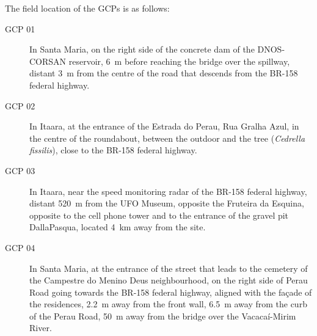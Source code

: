 The field location of the GCPs is as follows:

\begin{description}
\item[GCP 01]
In Santa Maria, on the right side of the concrete dam of the DNOS-CORSAN reservoir, \SI{6}{\m} 
before reaching the bridge over the spillway, distant \SI{3}{\m} from the centre of the road that descends 
from the BR-158 federal highway.

\item[GCP 02]
In Itaara, at the entrance of the Estrada do Perau, Rua Gralha Azul, in the centre of the roundabout, between 
the outdoor and the tree (\textit{Cedrella fissilis}), close to the BR-158 federal highway.

\item[GCP 03]
In Itaara, near the speed monitoring radar of the BR-158 federal highway, distant \SI{520}{\m} from the UFO 
Museum, opposite the Fruteira da Esquina, opposite to the cell phone tower and to the entrance of the gravel 
pit DallaPasqua, located \SI{4}{\km} away from the site.

\item[GCP 04]
In Santa Maria, at the entrance of the street that leads to the cemetery of the Campestre do Menino Deus 
neighbourhood, on the right side of Perau Road going towards the BR-158 federal highway, aligned with the 
façade of the residences, \SI{2.2}{\m} away from the front wall, \SI{6.5}{\m} away from the curb of the Perau 
Road, \SI{50}{\m} away from the bridge over the Vacacaí-Mirim River.


\end{description}
